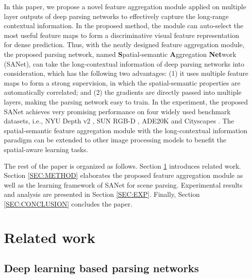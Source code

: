 \documentclass[10pt,twocolumn,twoside]{IEEEtran}
\begin{document}
In this paper, we propose a novel feature aggregation module applied on multiple layer outputs of deep parsing networks to effectively capture the long-range contextual information. In the proposed method, the module can auto-select the most useful feature maps to form a discriminative visual feature representation for dense prediction. Thus, with the neatly designed feature aggregation module, the proposed parsing network, named {\bf S}patial-semantic {\bf A}ggregation {\bf Net}work (SANet), can take the long-contextual information of deep parsing networks into consideration, which has the following two advantages: (1) it uses multiple feature maps to form a strong supervision, in which the spatial-semantic properties are automatically correlated; and (2) the gradients are directly passed into multiple layers, making the parsing network easy to train. In the experiment, the proposed SANet achieves very promising performance on four widely used benchmark datasets, i.e., NYU Depth v2 \cite{ECCV12:NYU}, SUN RGB-D \cite{NIPS14:SUN}, ADE20K \cite{CVPR17:ADE20K} and Cityscapes \cite{CVPR16:CITYSCAPES}. The spatial-semantic feature aggregation module with the long-contextual information paradigm can be extended to other image processing models to benefit the spatial-aware learning tasks.

The rest of the paper is organized as follows. Section \ref{SEC:RELATED_WORK} introduces related work. Section \ref{SEC:METHOD} elaborates the proposed feature aggregation module as well as the learning framework of SANet for scene parsing. Experimental results and analysis are presented in Section \ref{SEC:EXP}. Finally, Section \ref{SEC:CONCLUSION} concludes the paper.



\section{Related work}
\label{SEC:RELATED_WORK}

\subsection{Deep learning based parsing networks}
\end{document}
